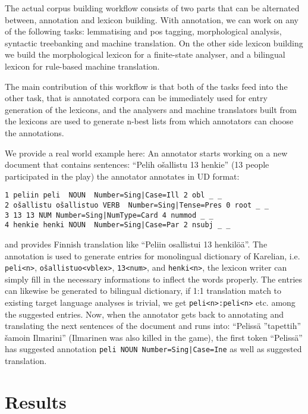 \documentclass[11pt]{article}
\begin{document}
The actual corpus building workflow consists of two parts that can be
alternated between, annotation and lexicon building. With annotation, we can
work on any of the following tasks: lemmatising and pos tagging, morphological
analysis, syntactic treebanking and machine translation. On the other side
lexicon building we build the morphological lexicon for a finite-state analyser,
and a bilingual lexicon for rule-based machine translation.

The main contribution of this workflow is that both of the tasks feed into
the other task, that is annotated corpora can be immediately used for entry
generation of the lexicons, and the analysers and machine translators
built from the lexicons are used to generate n-best lists from which annotators
can choose the annotations.

We provide a real world example here: An annotator starts working on a new
document that contains sentences: ``Pelih ošallistu 13 henkie'' (13 people
participated in the play) the annotator annotates in UD format:
\begin{scriptsize}
\begin{verbatim}
1 peliin peli  NOUN  Number=Sing|Case=Ill 2 obl _ _
2 ošallistu ošallistuo VERB  Number=Sing|Tense=Pres 0 root _ _
3 13 13 NUM Number=Sing|NumType=Card 4 nummod _ _
4 henkie henki NOUN  Number=Sing|Case=Par 2 nsubj _ _
\end{verbatim}
\end{scriptsize}
and provides Finnish translation like ``Peliin
osallistui 13 henkilöä''.  The annotation is used to generate entries for
monolingual dictionary of Karelian, i.e. \verb|peli<n>|,
\verb|ošallistuo<vblex>|, \verb|13<num>|, and \verb|henki<n>|, the lexicon
writer can simply fill in the necessary informations to inflect the words
properly. The entries can likewise be generated to bilingual dictionary, if 1:1
translation match to existing target language analyses is trivial, we get
\verb|peli<n>:peli<n>| etc. among the suggested entries. Now, when the
annotator gets back to annotating and translating the next sentences of the
document and runs into: ``Pelissä ”tapettih” šamoin Ilmarini'' (Ilmarinen was
also killed in the game), the first token ``Pelissä'' has suggested annotation
\texttt{peli NOUN Number=Sing|Case=Ine} as well as suggested translation.


\section{Results}
\label{sec:results}
\end{document}
